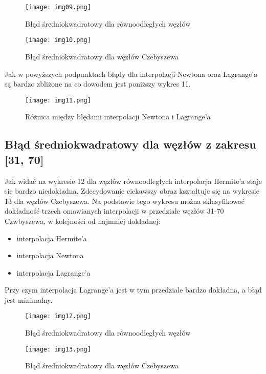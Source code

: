 \documentclass{article}
\begin{document}
\begin{figure}[H]
  \begin{minipage}[b]{0.49\textwidth}
    \texttt{[image: img09.png]}
    \caption{Błąd średniokwadratowy dla równoodległych węzłów}
  \end{minipage}
  \hfill
  \begin{minipage}[b]{0.49\textwidth}
    \texttt{[image: img10.png]}
    \caption{Błąd średniokwadratowy dla węzłów Czebyszewa}
  \end{minipage}
\end{figure}

Jak w powyższych podpunktach błądy dla interpolacji Newtona oraz Lagrange'a są bardzo zbliżone na co dowodem jest poniższy wykres 11.

\begin{figure}[H]
  \centering
  \begin{minipage}[b]{0.93\textwidth}
    \texttt{[image: img11.png]}
    \caption{Różnica między błędami interpolacji Newtona i Lagrange'a}
  \end{minipage}
\end{figure}

\subsection{Błąd średniokwadratowy dla węzłów z zakresu [31, 70]}

Jak widać na wykresie 12 dla węzłów równoodległych interpolacja Hermite'a staje się bardzo niedokładna. Zdecydowanie ciekawszy obraz kształtuje się na wykresie 13 dla węzłów Czebyszewa. Na podstawie tego wykresu można sklasyfikować dokładność trzech omawianych interpolacji w przedziale węzłów 31-70 Czwbyszewa, w kolejności od najmniej dokładnej:

\begin{itemize}
\item interpolacja Hermite'a
\item interpolacja Newtona
\item interpolacja Lagrange'a
\end{itemize}

Przy czym interpolacja Lagrange'a jest w tym przedziale bardzo dokładna, a błąd jest minimalny. 

\begin{figure}[H]
  \begin{minipage}[b]{0.49\textwidth}
    \texttt{[image: img12.png]}
    \caption{Błąd średniokwadratowy dla równoodległych węzłów}
  \end{minipage}
  \hfill
  \begin{minipage}[b]{0.49\textwidth}
    \texttt{[image: img13.png]}
    \caption{Błąd średniokwadratowy dla węzłów Czebyszewa}
  \end{minipage}
\end{figure}
\end{document}
